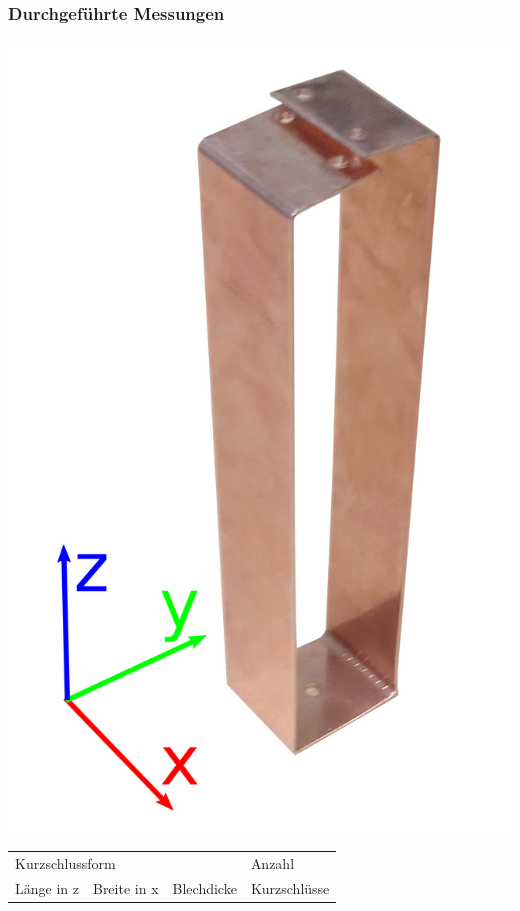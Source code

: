 \documentclass[accentcolor=tud9b, colorbacktitle, inverttitle]{tudbeamer}
\begin{document}
\begin{frame}\frametitle{Durchgef\"uhrte Messungen}
\vspace{-1em}
\begin{minipage}[t]{0.3\textwidth}
	\includegraphics[width=\textwidth]{KS}
\end{minipage}
\begin{minipage}[t]{0.6\textwidth}
\vspace{-0.75\textwidth}
	\begin{tabular}{ | l | l |  l | l | }
		\hline
		\multicolumn{3}{|l|}{Kurzschlussform} & Anzahl \\ \cline{0-2}
		L\"ange in z & Breite in x & Blechdicke & Kurzschl\"usse \\\hline

\end{tabular}
\end{minipage}
\end{frame}
\end{document}
